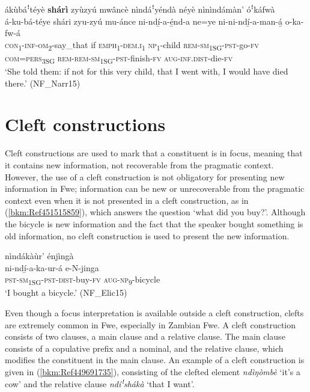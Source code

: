 \ea
\label{bkm:Ref99108454}
ákùbáꜝtéyè \textbf{shárì} zyùzyú mwâncè nìndáꜝyéndà néyè nìnìndámàn’ óꜝkáfwà\\
\gll á-ku-bá-téye      shári  zyu-zyú  mu-ánce ni-ndí̲-a-é̲nd-a    ne=ye  ni-ni-ndí̲-a-man-á̲      o-ka-fw-á \\
\textsc{con}\textsubscript{1}-\textsc{inf}-\textsc{om}\textsubscript{2}-say\_that  if  \textsc{emph}\textsubscript{1}-\textsc{dem}.\textsc{i}\textsubscript{1}  \textsc{np}\textsubscript{1}-child
\textsc{rem}-\textsc{sm}\textsubscript{1SG}-\textsc{pst}-go-\textsc{fv}  \textsc{com}=\textsc{pers}\textsubscript{3SG}
\textsc{rem}-\textsc{rem}-\textsc{sm}\textsubscript{1SG}-\textsc{pst}-finish-\textsc{fv}  \textsc{aug}-\textsc{inf}.\textsc{dist}-die-\textsc{fv}\\
\glt ‘She told them: if not for this very child, that I went with, I would have died there.’ (NF\_Narr15)
\z
\section{Cleft constructions}
\hypertarget{Toc75352719}{}\label{bkm:Ref491333435}
Cleft constructions are used to mark that a constituent is in focus, meaning that it contains new information, not recoverable from the pragmatic context. However, the use of a cleft construction is not obligatory for presenting new information in Fwe; information can be new or unrecoverable from the pragmatic context even when it is not presented in a cleft construction, as in (\ref{bkm:Ref451515859}), which answers the question ‘what did you buy?’. Although the bicycle is new information and the fact that the speaker bought something is old information, no cleft construction is used to present the new information.

\ea
\label{bkm:Ref451515859}
nìndákàùr’ énjìngà\\
\gll ni-ndí̲-a-ka-ur-á      e-N-jinga\\
\textsc{pst}-\textsc{sm}\textsubscript{1SG}-\textsc{pst}-\textsc{dist}-buy-\textsc{fv}  \textsc{aug}-\textsc{np}\textsubscript{9}-bicycle\\
\glt ‘I bought a bicycle.’ (NF\_Elic15)
\z

Even though a focus interpretation is available outside a cleft construction, clefts are extremely common in Fwe, especially in Zambian Fwe. A cleft construction consists of two clauses, a main clause and a relative clause. The main clause consists of a copulative prefix and a nominal, and the relative clause, which modifies the constituent in the main clause. An example of a cleft construction is given in (\ref{bkm:Ref449691735}), consisting of the clefted element \textit{ndìŋòmbè} ‘it’s a cow’ and the relative clause \textit{ndíꜝ}\textit{shákà} ‘that I want’.

